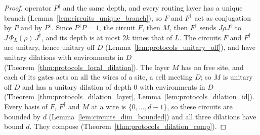 \begin{proof}
    operator $P^\dagger$ and the same depth, and every routing layer has a unique branch
    (Lemma~\ref{lem:circuits_unique_branch}), so $F$ and $F^\dagger$ act as conjugation by $P$
    and by $P^\dagger$. Since $P^\dagger P=1$, the circuit $F$, then $M$, then $F^\dagger$
    sends $J\rho J^\dagger$ to $J\,\Phi_L(\rho)\,J^\dagger$, and its depth is at most $2k$
    times that of $L$. The circuits $F$ and $F^\dagger$ are unitary, hence unitary off $D$
    (Lemma~\ref{lem:protocols_unitary_off}), and have unitary dilations with environments in
    $D$ (Theorem~\ref{thm:protocols_local_dilation}). The layer $M$ has no free site, and each
    of its gates acts on all the wires of a site, a cell meeting $D$; so $M$ is unitary off $D$
    and has a unitary dilation of depth $0$ with environments in $D$
    (Theorem~\ref{thm:protocols_dilation_layer}, Lemma~\ref{lem:protocols_dilation_id}). Every
    basis of $F$, $F^\dagger$ and $M$ at a wire is $\{0,\dots,d-1\}$, so these circuits are
    bounded by $d$ (Lemma~\ref{lem:circuits_dim_bounded}) and all three dilations have bound
    $d$. They compose (Theorem~\ref{thm:protocols_dilation_comp}).
\end{proof}

